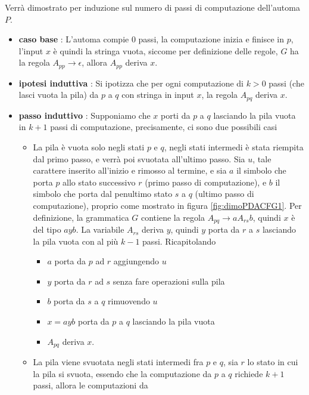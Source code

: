 \documentclass[10pt, letterpaper]{report}
\begin{document}
 Verrà dimostrato per induzione sul numero di passi di computazione dell'automa $P$.\begin{itemize}
    \item \textbf{caso base} : L'automa compie 0 passi, la computazione inizia e finisce in $p$, l'input $x$ è quindi 
    la stringa vuota, siccome per definizione delle regole, $G$ ha la regola $A_{pp}\longrightarrow\epsilon$, allora 
    $A_{pp}$ deriva $x$. 
    \item \textbf{ipotesi induttiva} : Si ipotizza che per ogni computazione  di $k>0$ passi (che lasci vuota 
    la pila) da $p$ a $q$ con stringa in input 
    $x$, la regola $A_{pq}$ deriva $x$.  
    \item \textbf{passo induttivo} : Supponiamo che $x$ porti da $p$ a $q$ lasciando la pila vuota in $k+1$ passi di 
    computazione, precisamente, ci sono due possibili casi \begin{itemize}
        \item La pila è vuota solo negli stati $p$ e $q$, negli stati intermedi è stata riempita dal primo passo, e verrà 
        poi svuotata all'ultimo passo. Sia $u$, tale carattere inserito all'inizio e rimosso al termine, e sia $a$
        il simbolo che porta $p$ allo stato successivo $r$ (primo passo di computazione), e $b$ il simbolo che porta dal 
        penultimo stato $s$ a $q$ (ultimo passo di computazione), proprio come mostrato in figura \ref{fig:dimoPDACFG1}. Per 
        definizione, la grammatica $G$ contiene la regola $A_{pq}\longrightarrow aA_{rs}b$, quindi $x$ è del tipo 
        $ayb$. La variabile $A_{rs}$ deriva $y$, quindi $y$ porta da $r$ a $s$ lasciando la pila vuota con al più 
        $k-1$ passi. Ricapitolando\begin{itemize}
            \item $a$ porta da $p$ ad $r$ aggiungendo $u$
            \item $y$ porta da $r$ ad $s$ senza fare operazioni sulla pila 
            \item $b$ porta da $s$ a $q$ rimuovendo $u$
            \item $x=ayb$ porta da $p$ a $q$ lasciando la pila vuota 
            \item $A_{pq}$ deriva $x$.
        \end{itemize}
        \item La pila viene svuotata negli stati intermedi fra $p$ e $q$, sia $r$ lo stato in cui la pila 
        si svuota, essendo che la computazione da $p$ a $q$ richiede $k+1$ passi, allora le computazioni da 

\end{itemize}
\end{itemize}
\end{document}
